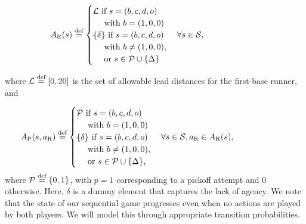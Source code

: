 \documentclass[opre,dblanonrev]{informs4}
\newcommand{\defeq}{\stackrel{\text{def}}{=}}
\begin{document}
    \begin{align}
    \label{eqn:runner_action_sapce}
    \hspace*{-20mm}
      \begin{split}
        A_\text{R}(s) 
        & \defeq \begin{cases}
          {\cal L} \text{ if } s = (b,c,d,o)\\
          \quad \text{ with } b = (1,0,0)\\
          \{\delta\} \text{ if } s = (b,c,d,o)\\
          \quad \text{ with } b \neq (1,0,0),\\
          \quad \text{ or } s \in {\cal P} \cup \{\Delta\}
        \end{cases} \forall s \in {\cal S},
      \end{split}
    \end{align}
        
    where ${\cal L} \defeq [0,20]$ is the set of allowable lead distances for the first-base runner, and
    
    \begin{align}
      \label{eqn:pitcher_action_sapce}
      \hspace*{-20mm}
      \begin{split}
        A_{\text{P}}(s,a_\text{R})
        & \defeq \begin{cases}
          {\cal P} \text{ if } s = (b,c,d,o)\\
            \quad \text{ with } b = (1,0,0) \\
          \{\delta\} \text{ if } s = (b,c,d,o)\\
            \quad \text{ with } b \neq (1,0,0),\\
            \quad \text{ or } s \in {\cal P} \cup \{\Delta\},
        \end{cases} \forall s \in {\cal S}, a_\text{R} \in A_\text{R}(s),
      \end{split}
    \end{align} 
    where ${\cal P} \defeq \{0,1\}$, with $p = 1$ corresponding to a pickoff attempt and $0$ otherwise.  Here, $\delta$ is a dummy element that captures the lack of agency. We note that the state of our sequential game progresses even when no actions are played by both players. We will model this through appropriate transition probabilities.  
\end{document}
